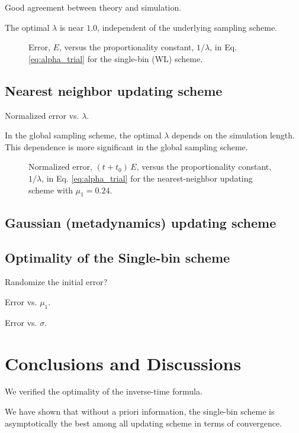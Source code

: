 \documentclass[reprint]{revtex4-1}
\begin{document}
Good agreement between theory and simulation.

The optimal $\lambda$ is near $1.0$,
independent of the underlying sampling scheme.



\begin{figure}[h]
\begin{center}
  \caption{
    \label{fig:err_singlebin}
    Error, $E$, versus the proportionality constant, $1/\lambda$,
    in Eq. \eqref{eq:alpha_trial}
    for the single-bin (WL) scheme.
  }
\end{center}
\end{figure}



\subsection{Nearest neighbor updating scheme}

Normalized error vs. $\lambda$.

In the global sampling scheme,
the optimal $\lambda$ depends on the simulation length.
This dependence is more significant in the global sampling scheme.


\begin{figure}[h]
\begin{center}
  \caption{
    \label{fig:err_nnbr}
    Normalized error, $(t + t_0) \, E$,
    versus the proportionality constant, $1/\lambda$,
    in Eq. \eqref{eq:alpha_trial}
    for the nearest-neighbor updating scheme with $\mu_1 = 0.24$.
  }
\end{center}
\end{figure}





\subsection{Gaussian (metadynamics) updating scheme}


\subsection{Optimality of the Single-bin scheme}

Randomize the initial error?

Error vs. $\mu_1$.

Error vs. $\sigma$.


\section{\label{sec:conclusion}
Conclusions and Discussions}


We verified the optimality of the inverse-time formula.

We have shown that
without a priori information,
the single-bin scheme is asymptotically
the best among all updating scheme
in terms of convergence.



\end{document}
